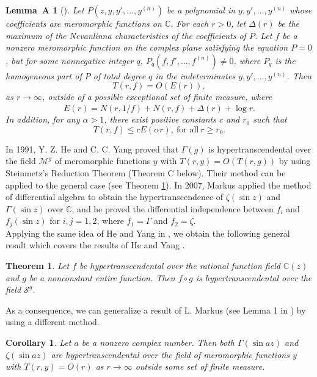 \documentclass[reqno,12pt]{amsart}
\newtheorem{thm}{Theorem}
\newtheorem{cor}{Corollary}
\newtheorem*{lemA}{Lemma~A}
\begin{document}
\begin{lemA}[\cite{Bank761}]
Let $P(z, y, y', \dots, y^{(n)})$ be a polynomial in $y, y', \dots, y^{(n)}$ whose coefficients are meromorphic functions on $\mathbb{C}$. For each $r>0$, let $\Delta(r)$ be the maximum of the Nevanlinna characteristics of the coefficients of $P$. Let $f$ be a nonzero meromorphic function on the complex plane satisfying the equation $P=0$, but for some nonnegative integer $q$, $P_q(f, f', \dots, f^{(n)})\neq 0$, where $P_q$ is the homogeneous part of $P$ of total degree $q$ in the indeterminates $y, y', \dots, y^{(n)}$. Then 
$$T(r, f)=O(E(r)),$$ as $r\to\infty$, 
outside of a possible exceptional set of finite measure, 
where $$E(r)=\overline N(r, 1/f)+\overline N(r, f) +\Delta(r)+\log r.$$ In addition, for any $\alpha>1$, there exist positive constants $c$ and $r_0$ such that $$T(r, f)\leq cE(\alpha r), \ \mbox{for all}\ r\geq r_0.$$
\end{lemA}

In 1991, Y. Z. He and C. C. Yang \cite{HY91} proved that $\Gamma(g)$ is hypertranscendental over the field $\mathcal{M}^g$ of meromorphic functions $y$ with $T(r, y)=O(T(r, g))$ by using Steinmetz's Reduction Theorem (Theorem C below). Their method can be applied to the general case (see Theorem \ref{thm:fg}).  In 2007,  Markus \cite{Markus07} applied the method of differential algebra to obtain the hypertranscendence of $\zeta(\sin z)$ and $\Gamma(\sin z)$ over $\mathbb{C}$, and he proved  the differential independence between $f_i$ and $f_j(\sin z)$ for $i, j =1, 2$, where $f_1=\Gamma$ and  $f_2=\zeta$.\\

Applying the same idea of He and Yang in \cite{HY91}, we obtain the following general result which covers the results of He and Yang \cite{HY91}.
\begin{thm}\label{thm:fg}
Let $f$ be hypertranscendental over the rational function field $\mathbb{C}(z)$ and $g$ be a nonconstant entire function. Then $f\circ g$ is hypertranscendental over the field $\mathcal{S}^g$.
\end{thm}

As a consequence, we can generalize a result of L. Markus (see Lemma 1 in \cite{Markus07}) by using a different method.
\begin{cor} Let $a$ be a nonzero complex number. Then
both $\Gamma(\sin az)$ and $\zeta(\sin az)$ are hypertranscendental over the field of meromorphic functions $y$ with $T(r, y)=O(r)$ as $r\rightarrow\infty$ outside some set of finite measure.
\end{cor}
\end{document}
